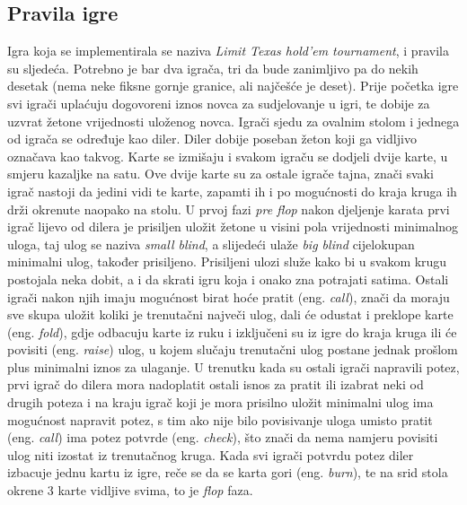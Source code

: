 \subsection{Pravila igre}
Igra koja se implementirala se naziva \emph{Limit Texas hold'em tournament}, i pravila su sljedeća. 
Potrebno je bar dva igrača, tri da bude zanimljivo pa do nekih desetak (nema neke fiksne gornje granice, 
ali najčešće je deset). Prije početka igre svi igrači uplaćuju dogovoreni iznos novca za sudjelovanje u igri, te dobije za uzvrat žetone vrijednosti uloženog novca. Igrači sjedu za ovalnim stolom i jednega od igrača se određuje kao diler. Diler dobije poseban žeton koji ga vidljivo označava kao takvog. Karte se izmišaju i svakom igraču se dodjeli dvije karte, u smjeru kazaljke na satu. Ove dvije karte su za ostale igrače tajna, znači svaki igrač nastoji da jedini vidi te karte, zapamti ih i po mogućnosti do kraja kruga ih drži okrenute naopako na stolu. U prvoj fazi \emph{pre flop} nakon djeljenje karata prvi igrač lijevo od dilera je prisiljen uložit žetone u visini pola vrijednosti minimalnog uloga, taj ulog se naziva \emph{small blind}, a slijedeći ulaže \emph{big blind} cijelokupan minimalni ulog, također prisiljeno. Prisiljeni ulozi služe kako bi u svakom krugu postojala neka dobit, a i da skrati igru koja i onako zna potrajati satima. Ostali igrači nakon njih imaju mogućnost birat hoće pratit (eng. \textit{call}), znači da moraju sve skupa uložit koliki je trenutačni največi ulog, dali će odustat i preklope karte (eng. \textit{fold}), gdje odbacuju karte iz ruku i izključeni su iz igre do kraja kruga ili će povisiti (eng. \textit{raise}) ulog, u kojem slučaju trenutačni ulog postane jednak prošlom plus minimalni iznos za ulaganje. U trenutku kada su ostali igrači napravili potez, prvi igrač do dilera mora nadoplatit ostali isnos za pratit ili izabrat neki od drugih poteza i na kraju igrač koji je mora prisilno uložit minimalni ulog ima mogućnost napravit potez, s tim ako nije bilo povisivanje uloga umisto pratit (eng. \textit{call}) ima potez potvrde (eng. \textit{check}), što znači da nema namjeru povisiti ulog niti izostat iz trenutačnog kruga. Kada svi igrači potvrdu potez diler izbacuje jednu kartu iz igre, reče se da se karta gori (eng. \textit{burn}), te na srid stola okrene 3 karte vidljive svima, to je \emph{flop} faza. 
